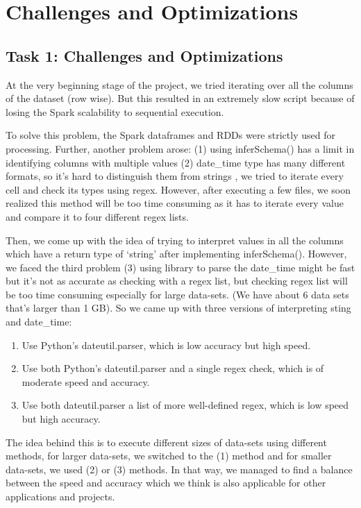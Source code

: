 \documentclass[sigconf,authordraft]{acmart}
\begin{document}
\section{Challenges and Optimizations}
\subsection{Task 1: Challenges and Optimizations}
At the very beginning stage of the project, we tried iterating over all the columns of the dataset (row wise). But this resulted in an extremely slow script because of losing the Spark scalability to sequential execution. 
 
To solve this problem, the Spark dataframes and RDDs were strictly used for processing. Further, another problem arose: (1) using inferSchema() has a limit in identifying columns with multiple values (2) date\_time type has many different formats, so it’s hard to distinguish them from strings , we tried to iterate every cell and check its types using regex. However, after executing a few files, we soon realized this method will be too time consuming as it has to iterate every value and compare it to four different regex lists. 

Then, we come up with the idea of trying to interpret values in all the columns which have a return type of ‘string’ after implementing inferSchema(). However, we faced the third problem (3) using library to parse the date\_time might be fast but it’s not as accurate as checking with a regex list, but checking regex list will be too time consuming especially for large data-sets. (We have about 6 data sets that’s larger than 1 GB). So we came up with three versions of interpreting sting and date\_time:
\begin{enumerate}
    \item Use Python’s dateutil.parser, which is low accuracy but high speed.
    \item Use both Python’s dateutil.parser and a single regex check, which is of moderate speed and accuracy.
    \item Use both dateutil.parser a list of more well-defined regex, which is low speed but high accuracy.
\end{enumerate}

The idea behind this is to execute different sizes of data-sets using different methods, for larger data-sets, we switched to the (1) method and for smaller data-sets, we used (2) or (3) methods. In that way, we managed to find a balance between the speed and accuracy which we think is also applicable for other applications and projects.  
\end{document}

